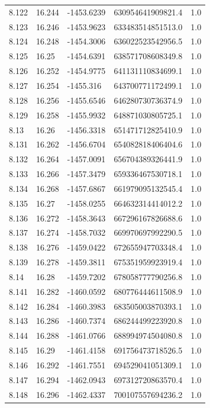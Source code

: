 \begin{tabular}{lllll}
8.122 & 16.244 & -1453.6239 & 630954641909821.4 & 1.0 \\
8.123 & 16.246 & -1453.9623 & 633483514851513.0 & 1.0 \\
8.124 & 16.248 & -1454.3006 & 636022523542956.5 & 1.0 \\
8.125 & 16.25 & -1454.6391 & 638571708608349.8 & 1.0 \\
8.126 & 16.252 & -1454.9775 & 641131110834699.1 & 1.0 \\
8.127 & 16.254 & -1455.316 & 643700771172499.1 & 1.0 \\
8.128 & 16.256 & -1455.6546 & 646280730736374.9 & 1.0 \\
8.129 & 16.258 & -1455.9932 & 648871030805725.1 & 1.0 \\
8.13 & 16.26 & -1456.3318 & 651471712825410.9 & 1.0 \\
8.131 & 16.262 & -1456.6704 & 654082818406404.6 & 1.0 \\
8.132 & 16.264 & -1457.0091 & 656704389326441.9 & 1.0 \\
8.133 & 16.266 & -1457.3479 & 659336467530718.1 & 1.0 \\
8.134 & 16.268 & -1457.6867 & 661979095132545.4 & 1.0 \\
8.135 & 16.27 & -1458.0255 & 664632314414012.2 & 1.0 \\
8.136 & 16.272 & -1458.3643 & 667296167826688.6 & 1.0 \\
8.137 & 16.274 & -1458.7032 & 669970697992290.5 & 1.0 \\
8.138 & 16.276 & -1459.0422 & 672655947703348.4 & 1.0 \\
8.139 & 16.278 & -1459.3811 & 675351959923919.4 & 1.0 \\
8.14 & 16.28 & -1459.7202 & 678058777790256.8 & 1.0 \\
8.141 & 16.282 & -1460.0592 & 680776444611508.9 & 1.0 \\
8.142 & 16.284 & -1460.3983 & 683505003870393.1 & 1.0 \\
8.143 & 16.286 & -1460.7374 & 686244499223920.8 & 1.0 \\
8.144 & 16.288 & -1461.0766 & 688994974504080.8 & 1.0 \\
8.145 & 16.29 & -1461.4158 & 691756473718526.5 & 1.0 \\
8.146 & 16.292 & -1461.7551 & 694529041051309.1 & 1.0 \\
8.147 & 16.294 & -1462.0943 & 697312720863570.4 & 1.0 \\
8.148 & 16.296 & -1462.4337 & 700107557694236.2 & 1.0 \\

\end{tabular}
